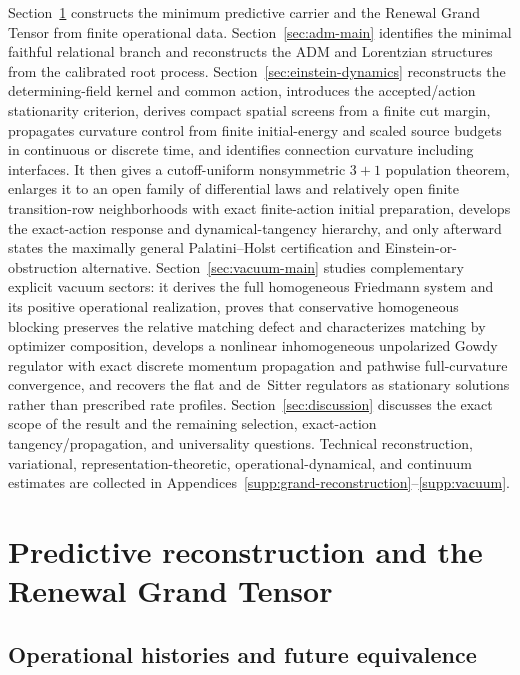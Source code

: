 \documentclass[11pt]{article}
\theoremstyle{definition}
\theoremstyle{remark}
\begin{document}
Section~\ref{sec:grand-tensor-main} constructs the minimum predictive carrier
and the Renewal Grand Tensor from finite operational data.
Section~\ref{sec:adm-main} identifies the minimal faithful relational branch
and reconstructs the ADM and Lorentzian structures from the calibrated root
process.  Section~\ref{sec:einstein-dynamics} reconstructs the
determining-field kernel and common action, introduces the accepted/action
stationarity criterion, derives compact spatial screens from a finite cut
margin, propagates curvature control from finite initial-energy and scaled
source budgets in continuous or discrete time, and identifies connection
curvature including interfaces.  It then gives a cutoff-uniform nonsymmetric
$3+1$ population theorem, enlarges it to an open family of differential laws
and relatively open finite transition-row neighborhoods with exact
finite-action initial preparation, develops the exact-action response and
dynamical-tangency hierarchy, and only afterward states the maximally general
Palatini--Holst certification and Einstein-or-obstruction alternative.
Section~\ref{sec:vacuum-main} studies complementary explicit vacuum sectors:
it derives the full homogeneous Friedmann system and
its positive operational realization, proves that conservative homogeneous
blocking preserves the relative matching defect and characterizes matching
by optimizer composition, develops a nonlinear
inhomogeneous unpolarized Gowdy regulator with exact discrete momentum
propagation and pathwise full-curvature convergence, and recovers the flat and
de~Sitter regulators as stationary solutions rather than prescribed rate
profiles.
Section~\ref{sec:discussion} discusses the exact scope of the result and the
remaining selection, exact-action tangency/propagation, and universality questions.
Technical reconstruction, variational, representation-theoretic,
operational-dynamical, and continuum estimates are collected in
Appendices~\ref{supp:grand-reconstruction}--\ref{supp:vacuum}.





\section{Predictive reconstruction and the Renewal Grand Tensor}
\label{sec:grand-tensor-main}

\subsection{Operational histories and future equivalence}
\end{document}
